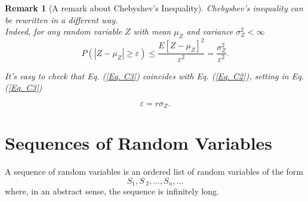 \documentclass[notes=show,smaller,handout]{beamer}\usepackage[]{graphicx}\usepackage[]{color}
\newtheorem{remark}{Remark}[section]
\renewcommand{\Pr}{P}
\begin{document}
\begin{frame}{\secname}

  \begin{remark}[A remark about Chebyshev's Inequality]
  Chebyshev's inequality can be rewritten in a different way. \\

  Indeed, for any random variable $Z$ with mean $\mu_Z$ and variance $\sigma_Z^2<\infty$
  \begin{equation}
  \Pr \left( \left\vert Z-\mu_Z\right\vert \geq \varepsilon \right) \leq \frac{E[Z-\mu_Z]^2}{\varepsilon^{2}} = \frac{\sigma_Z^2}{\varepsilon^{2}}. \label{Eq. C3}
  \end{equation}

   It's easy to check  that Eq. (\ref{Eq. C3}) coincides with Eq. (\ref{Eq. C2}), setting in Eq. (\ref{Eq. C3})

   $$
   \varepsilon = r \sigma_Z.
   $$

  \end{remark}
\end{frame}

\section{Sequences of Random Variables}

\begin{frame}{\secname}
  \begin{definition}
   A sequence of random variables is an ordered list of random variables
  of the form%
  \begin{equation*}
  S_{1},S\,_{2},...,S_{n},...
  \end{equation*}
  where, in an abstract sense, the sequence is infinitely long.
  \end{definition}
\end{frame}%
\end{document}
